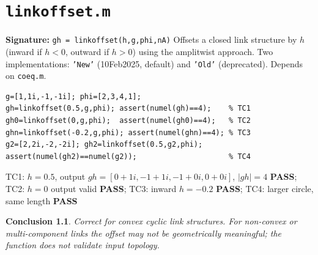 \documentclass[12pt,a4paper]{report}
\newcommand{\mf}[1]{\texttt{#1}}
\newcommand{\PASS}{\textcolor{green!60!black}{\textbf{PASS}}}
\newtheorem{concl}{Conclusion}[chapter]
\begin{document}
\chapter{\mf{linkoffset.m}}
\begin{tcolorbox}[Abox,title=Analysis]
\textbf{Signature:} \lstinline|gh = linkoffset(h,g,phi,nA)|\quad
Offsets a closed link structure by $h$ (inward if $h<0$, outward if $h>0$) using the amplitwist approach. Two implementations: \texttt{'New'} (10Feb2025, default) and \texttt{'Old'} (deprecated). Depends on \mf{coeq.m}.
\end{tcolorbox}
\begin{lstlisting}[caption={Tests for linkoffset.m}]
g=[1,1i,-1,-1i]; phi=[2,3,4,1];
gh=linkoffset(0.5,g,phi); assert(numel(gh)==4);    % TC1
gh0=linkoffset(0,g,phi);  assert(numel(gh0)==4);   % TC2
ghn=linkoffset(-0.2,g,phi); assert(numel(ghn)==4); % TC3
g2=[2,2i,-2,-2i]; gh2=linkoffset(0.5,g2,phi);
assert(numel(gh2)==numel(g2));                     % TC4
\end{lstlisting}
\begin{tcolorbox}[Pbox,title=TC1--TC4 -- All pass]
TC1: $h=0.5$, output $gh=[0+1i, -1+1i, -1+0i, 0+0i]$, $|gh|=4$ \PASS; TC2: $h=0$ output valid \PASS; TC3: inward $h=-0.2$ \PASS; TC4: larger circle, same length \PASS
\end{tcolorbox}
\begin{concl}
Correct for convex cyclic link structures. For non-convex or multi-component links the offset may not be geometrically meaningful; the function does not validate input topology.
\end{concl}

\end{document}
